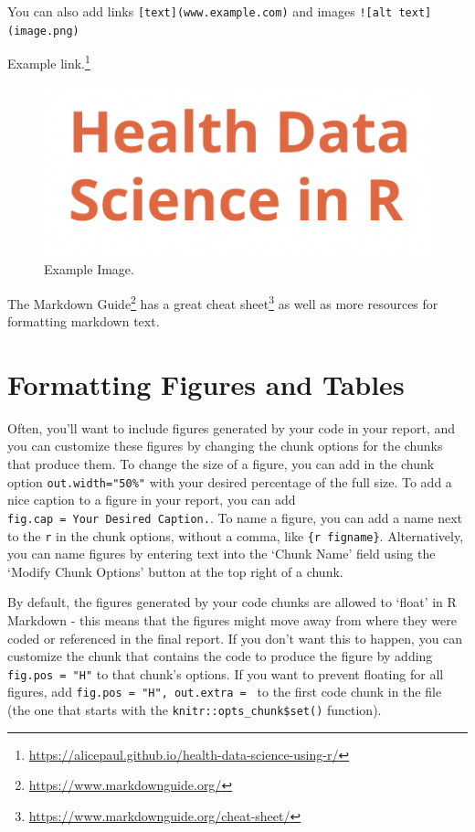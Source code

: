 \documentclass[
  letterpaper,
]{krantz}
\renewcommand{\href}[2]{#2\footnote{\url{#1}}}
\begin{document}
You can also add links \texttt{{[}text{]}(www.example.com)} and images
\texttt{!{[}alt\ text{]}(image.png)}

\href{https://alicepaul.github.io/health-data-science-using-r/}{Example
link.}

\begin{figure}[H]

{\centering \includegraphics{book/../images/logo.png}

}

\caption{Example Image.}

\end{figure}%

\href{https://www.markdownguide.org/}{The Markdown Guide} has a great
\href{https://www.markdownguide.org/cheat-sheet/}{cheat sheet} as well
as more resources for formatting markdown text.

\section{Formatting Figures and
Tables}\label{formatting-figures-and-tables}

Often, you'll want to include figures generated by your code in your
report, and you can customize these figures by changing the chunk
options for the chunks that produce them. To change the size of a
figure, you can add in the chunk option \texttt{out.width="50\%"} with
your desired percentage of the full size. To add a nice caption to a
figure in your report, you can add
\texttt{fig.cap\ =\ \textquotesingle{}Your\ Desired\ Caption.}. To name
a figure, you can add a name next to the \texttt{r} in the chunk
options, without a comma, like \texttt{\{r\ figname\}}. Alternatively,
you can name figures by entering text into the `Chunk Name' field using
the `Modify Chunk Options' button at the top right of a chunk.

By default, the figures generated by your code chunks are allowed to
`float' in R Markdown - this means that the figures might move away from
where they were coded or referenced in the final report. If you don't
want this to happen, you can customize the chunk that contains the code
to produce the figure by adding \texttt{fig.pos\ =\ "H"} to that chunk's
options. If you want to prevent floating for all figures, add
\texttt{fig.pos\ =\ "H",\ out.extra\ =\ \textquotesingle{}\textquotesingle{}}
to the first code chunk in the file (the one that starts with the
\texttt{knitr::opts\_chunk\$set()} function).
\end{document}
